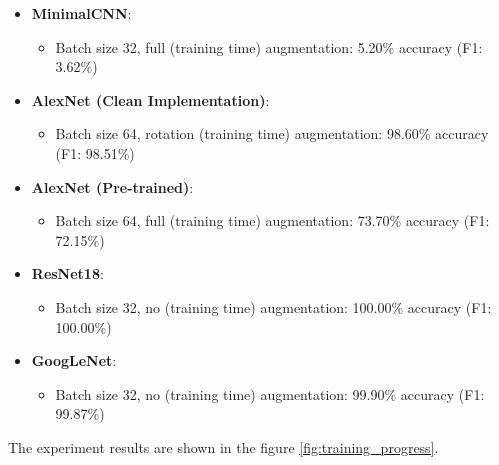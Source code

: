 \documentclass[conference]{IEEEtran}
\begin{document}
\begin{itemize}
    \item \textbf{MinimalCNN}:
        \begin{itemize}
            \item Batch size 32, full (training time) augmentation: 5.20\% accuracy (F1: 3.62\%)
        \end{itemize}

    \item \textbf{AlexNet (Clean Implementation)}:
        \begin{itemize}
            \item Batch size 64, rotation (training time) augmentation: 98.60\% accuracy (F1: 98.51\%)
        \end{itemize}
    
    \item \textbf{AlexNet (Pre-trained)}:
        \begin{itemize}
            \item Batch size 64, full (training time) augmentation: 73.70\% accuracy (F1: 72.15\%)
        \end{itemize}
    
    \item \textbf{ResNet18}:
        \begin{itemize}
            \item Batch size 32, no (training time) augmentation: 100.00\% accuracy (F1: 100.00\%)
        \end{itemize}
    
    \item \textbf{GoogLeNet}:
        \begin{itemize}
            \item Batch size 32, no (training time) augmentation: 99.90\% accuracy (F1: 99.87\%)
        \end{itemize}
\end{itemize}

The experiment results are shown in the figure \ref{fig:training_progress}.
\end{document}
